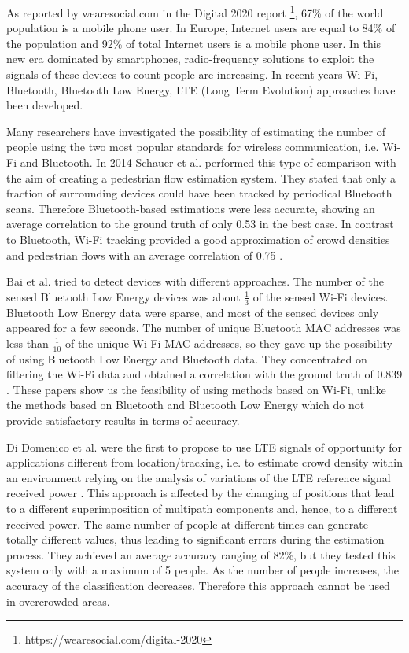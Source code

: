 As reported by wearesocial.com in the Digital 2020 report \footnote{https://wearesocial.com/digital-2020}, 67\% of the world population is a mobile phone user. In Europe, Internet users are equal to 84\% of the population and 92\% of total Internet users is a mobile phone user. In this new era dominated by smartphones, radio-frequency solutions to exploit the signals of these devices to count people are increasing. In recent years Wi-Fi, Bluetooth, Bluetooth Low Energy, LTE (Long Term Evolution) approaches have been developed.

Many researchers have investigated the possibility of estimating the number of people using the two most popular standards for wireless communication, i.e. Wi-Fi and Bluetooth. In 2014 Schauer et al. performed this type of comparison with the aim of creating a pedestrian flow estimation system. They stated that only a fraction of surrounding devices could have been tracked by periodical Bluetooth scans. Therefore Bluetooth-based estimations were less accurate, showing an average correlation to the ground truth of only 0.53 in the best case. In contrast to Bluetooth, Wi-Fi tracking provided a good approximation of crowd densities and pedestrian flows with an average correlation of 0.75 \cite{schauer2014estimating}.

Bai et al. tried to detect devices with different approaches. The number of the sensed Bluetooth Low Energy devices was about $\frac{1}{3}$ of the sensed Wi-Fi devices. Bluetooth Low Energy data were sparse, and most of the sensed devices only appeared for a few seconds. The number of unique Bluetooth MAC addresses was less than $\frac{1}{10}$ of the unique Wi-Fi MAC addresses, so they gave up the possibility of using Bluetooth Low Energy and Bluetooth data. They concentrated on filtering the Wi-Fi data and obtained a correlation with the ground truth of 0.839 \cite{bai2017lessons}.
These papers show us the feasibility of using methods based on Wi-Fi, unlike the methods based on Bluetooth and Bluetooth Low Energy which do not provide satisfactory results in terms of accuracy.

Di Domenico et al. were the first to propose to use LTE signals of opportunity for applications different from location/tracking, i.e. to estimate crowd density within an environment relying on the analysis of variations of the LTE reference signal received power \cite{di2017lte}. This approach is affected by the changing of positions that lead to a different superimposition of multipath components and, hence, to a different received power. The same number of people at different times can generate totally different values, thus leading to significant errors during the estimation process. They achieved an average accuracy ranging of 82\%, but they tested this system only with a maximum of 5 people. As the number of people increases, the accuracy of the classification decreases. Therefore this approach cannot be used in overcrowded areas.

